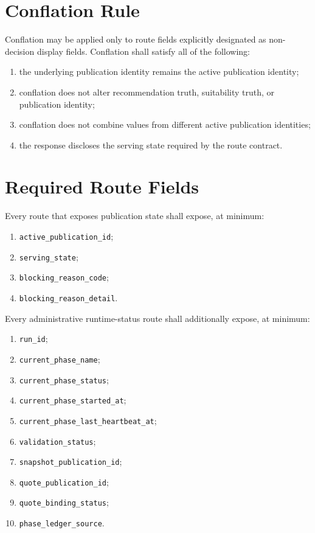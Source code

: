 \section{Conflation Rule}
Conflation may be applied only to route fields explicitly designated as non-decision display fields. Conflation shall satisfy all of the following:
\begin{enumerate}[leftmargin=1.2cm]
    \item the underlying publication identity remains the active publication identity;
    \item conflation does not alter recommendation truth, suitability truth, or publication identity;
    \item conflation does not combine values from different active publication identities;
    \item the response discloses the serving state required by the route contract.
\end{enumerate}

\section{Required Route Fields}
Every route that exposes publication state shall expose, at minimum:
\begin{enumerate}[leftmargin=1.2cm]
    \item \texttt{active\_publication\_id};
    \item \texttt{serving\_state};
    \item \texttt{blocking\_reason\_code};
    \item \texttt{blocking\_reason\_detail}.
\end{enumerate}

Every administrative runtime-status route shall additionally expose, at minimum:
\begin{enumerate}[leftmargin=1.2cm]
    \item \texttt{run\_id};
    \item \texttt{current\_phase\_name};
    \item \texttt{current\_phase\_status};
    \item \texttt{current\_phase\_started\_at};
    \item \texttt{current\_phase\_last\_heartbeat\_at};
    \item \texttt{validation\_status};
    \item \texttt{snapshot\_publication\_id};
    \item \texttt{quote\_publication\_id};
    \item \texttt{quote\_binding\_status};
    \item \texttt{phase\_ledger\_source}.
\end{enumerate}

